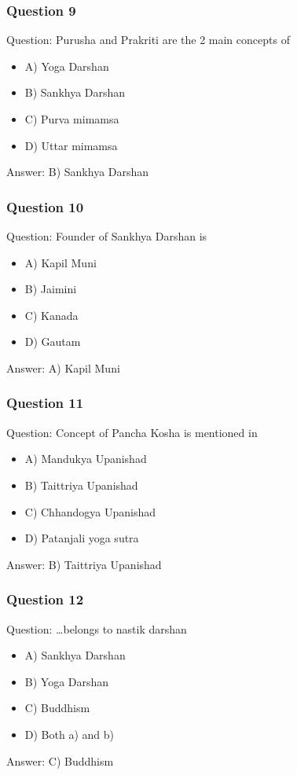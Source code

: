 \begin{frame}[fragile]\frametitle{Question 9}
Question: Purusha and Prakriti are the 2 main concepts of
\begin{itemize}
\item A) Yoga Darshan
\item B) Sankhya Darshan
\item C) Purva mimamsa
\item D) Uttar mimamsa
\end{itemize}
Answer: B) Sankhya Darshan
\end{frame}

\begin{frame}[fragile]\frametitle{Question 10}
Question: Founder of Sankhya Darshan is
\begin{itemize}
\item A) Kapil Muni
\item B) Jaimini
\item C) Kanada
\item D) Gautam
\end{itemize}
Answer: A) Kapil Muni
\end{frame}

\begin{frame}[fragile]\frametitle{Question 11}
Question: Concept of Pancha Kosha is mentioned in
\begin{itemize}
\item A) Mandukya Upanishad
\item B) Taittriya Upanishad
\item C) Chhandogya Upanishad
\item D) Patanjali yoga sutra
\end{itemize}
Answer: B) Taittriya Upanishad
\end{frame}

\begin{frame}[fragile]\frametitle{Question 12}
Question: \ldots belongs to nastik darshan
\begin{itemize}
\item A) Sankhya Darshan
\item B) Yoga Darshan
\item C) Buddhism
\item D) Both a) and b)
\end{itemize}
Answer: C) Buddhism
\end{frame}

